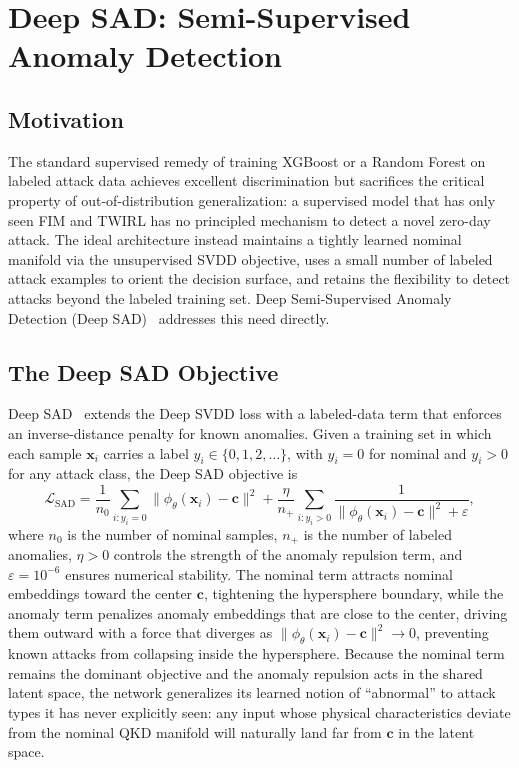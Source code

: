 \documentclass[12pt, a4paper]{report}
\begin{document}
\section{Deep SAD: Semi-Supervised Anomaly Detection}\label{sec:deep_sad}

\subsection{Motivation}
The standard supervised remedy of training XGBoost or a Random Forest on labeled attack data achieves excellent discrimination but sacrifices the critical property of out-of-distribution generalization: a supervised model that has only seen FIM and TWIRL has no principled mechanism to detect a novel zero-day attack. The ideal architecture instead maintains a tightly learned nominal manifold via the unsupervised SVDD objective, uses a small number of labeled attack examples to orient the decision surface, and retains the flexibility to detect attacks beyond the labeled training set. Deep Semi-Supervised Anomaly Detection (Deep SAD)~\cite{ruff2019deep_sad} addresses this need directly.

\subsection{The Deep SAD Objective}
Deep SAD~\cite{ruff2019deep_sad} extends the Deep SVDD loss with a labeled-data term that enforces an inverse-distance penalty for known anomalies. Given a training set in which each sample $\mathbf{x}_i$ carries a label $y_i \in \{0, 1, 2, \ldots\}$, with $y_i = 0$ for nominal and $y_i > 0$ for any attack class, the Deep SAD objective is
\begin{equation}\label{eq:deep_sad}
    \mathcal{L}_{\text{SAD}} = \frac{1}{n_0}\sum_{i: y_i = 0} \|\phi_\theta(\mathbf{x}_i) - \mathbf{c}\|^2 + \frac{\eta}{n_+}\sum_{i: y_i > 0} \frac{1}{\|\phi_\theta(\mathbf{x}_i) - \mathbf{c}\|^2 + \varepsilon},
\end{equation}
where $n_0$ is the number of nominal samples, $n_+$ is the number of labeled anomalies, $\eta > 0$ controls the strength of the anomaly repulsion term, and $\varepsilon = 10^{-6}$ ensures numerical stability. The nominal term attracts nominal embeddings toward the center $\mathbf{c}$, tightening the hypersphere boundary, while the anomaly term penalizes anomaly embeddings that are close to the center, driving them outward with a force that diverges as $\|\phi_\theta(\mathbf{x}_i) - \mathbf{c}\|^2 \to 0$, preventing known attacks from collapsing inside the hypersphere. Because the nominal term remains the dominant objective and the anomaly repulsion acts in the shared latent space, the network generalizes its learned notion of ``abnormal'' to attack types it has never explicitly seen: any input whose physical characteristics deviate from the nominal QKD manifold will naturally land far from $\mathbf{c}$ in the latent space.
\end{document}

